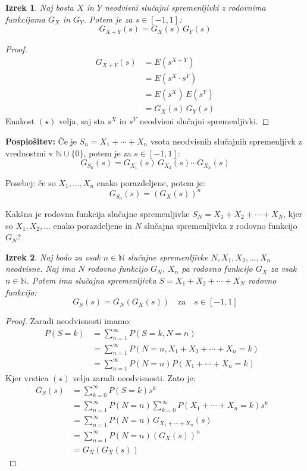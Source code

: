 \documentclass[12pt]{book}
\def\n{\noindent}
\def\s{\vspace{10pt}}
\theoremstyle{definition}
\theoremstyle{plain}
\newtheorem{izrek}{Izrek}
\theoremstyle{plain}
\theoremstyle{plain}
\theoremstyle{remark}
\begin{document}
\begin{izrek}
    Naj bosta $X$ in $Y$ neodvisni slučajni spremenljivki z rodovnima funkcijama $G_X$ in $G_Y$. Potem je za $s \in [-1,1]$: 
    $$
    G_{X+Y}(s)=G_X(s) \, G_Y(s)
    $$
\end{izrek}

\begin{proof}
    \begin{align*}
        G_{X+Y}(s)&=E\left(s^{X+Y}\right) \\
        &=E(s^X \cdot s^Y) \\
        &=E(s^X) \, E(s^Y) \tag{$\star$} \\
        &=G_X(s) \, G_Y(s)
    \end{align*}
    Enakost $(\star)$ velja, saj sta $s^X$ in $s^Y$ neodvisni slučajni spremenljivki.
\end{proof}

\n \textbf{Posplošitev:} Če je $S_n=X_1 + \cdots + X_n$ vsota neodvisnih slučajnih spremenljivk z vrednostmi v $\mathbb{N} \cup \{0\}$, potem je za $s \in [-1, 1]$: 
$$
G_{S_n}(s)=G_{X_1}(s)\, G_{X_2}(s) \cdots G_{X_n}(s)
$$

\n Posebej: če so $X_1, \ldots, X_n$ enako porazdeljene, potem je: 
$$
G_{S_n}(s)=\left(G_X(s)\right)^n
$$

\s

\n Kakšna je rodovna funkcija slučajne spremenljivke $S_N=X_1 + X_2 + \cdots + X_N$, kjer so $X_1, X_2, \ldots$ enako porazdeljene in $N$ slučajna spremenljivka z rodovno funkcijo $G_N$?

\begin{izrek}
    Naj bodo za vsak $n \in \mathbb{N}$ slučajne spremenljivke $N, X_1, X_2, \ldots, X_n$ neodvisne. Naj ima $N$ rodovno funkcijo $G_N$, $X_n$ pa rodovno funkcijo $G_X$ za vsak $n \in \mathbb{N}$. Potem ima slučajna spremenljivka $S=X_1+X_2+\cdots+X_N$ rodovno funkcijo: 
    $$
    G_S(s)=G_N\left(G_X(s)\right) \quad \text{za} \quad s \in [-1,1]
    $$
\end{izrek}

\begin{proof}
    Zaradi neodvisnosti imamo: 
    \begin{align*}
        P(S=k)&=\sum_{n=1}^{\infty} P(S=k, N=n) & \\
        &=\sum_{n=1}^{\infty} P\left(N=n, X_1+X_2+ \cdots +X_n=k\right) & \\
        &=\sum_{n=1}^{\infty} P(N=n) P\left(X_1+\cdots+X_n=k\right) & \tag{$\star$}
    \end{align*}
    Kjer vrstica $(\star)$ velja zaradi neodvisnosti. Zato je: 
    \begin{align*}
        G_S(s)&=\sum_{k=0}^{\infty} P(S=k) s^k & \\
        &=\sum_{n=1}^{\infty} P(N=n) \sum_{k=0}^{\infty} P\left(X_1+\cdots+X_n=k\right)  s^k & \\
        &=\sum_{n=1}^{\infty} P(N=n) \, G_{X_1+\cdots+X_n}\left(s\right) & \\
        &=\sum_{n=1}^{\infty} P(N=n) \left(G_X(s)\right)^n & \\
        &=G_N\left(G_X(s)\right)
    \end{align*}
\end{proof}
\end{document}
